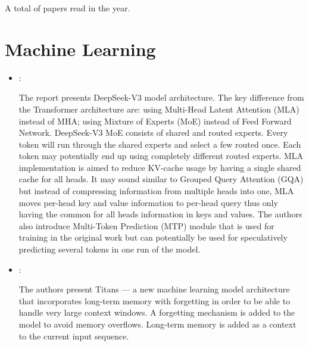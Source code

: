 



A total of  papers read in the year.

\section*{Machine Learning}
\begin{itemize}
    \item \cite{DeepSeekAI:2025:DeepSeekV3}:

    The report presents DeepSeek-V3 model architecture. The key difference from the Transformer architecture are: using Multi-Head Latent Attention (MLA) instead of MHA; using Mixture of Experts (MoE) instead of Feed Forward Network. DeepSeek-V3 MoE consists of shared and routed experts. Every token will run through the shared experts and select a few routed once. Each token may potentially end up using completely different routed experts. MLA implementation is aimed to reduce KV-cache usage by having a single shared cache for all heads. It may sound similar to Grouped Query Attention (GQA) but instead of compressing information from multiple heads into one, MLA moves per-head key and value information to per-head query thus only having the common for all heads information in keys and values. The authors also introduce Multi-Token Prediction (MTP) module that is used for training in the original work but can potentially be used for speculatively predicting several tokens in one run of the model.

    \item \cite{Behrouz:Titans:2024}:

    The authors present Titans --- a new machine learning model architecture that incorporates long-term memory with forgetting in order to be able to handle very large context windows. A forgetting mechanism is added to the model to avoid memory overflows. Long-term memory is added as a context to the current input sequence.
\end{itemize}


